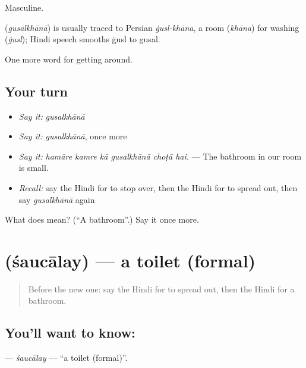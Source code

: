 Masculine.

\begin{cousinweb}
\textbf{} (\emph{gusalkhānā}) is usually traced to Persian \emph{ġusl-khāna}, a room (\emph{khāna}) for washing (\emph{ġusl}); Hindi speech smooths ġusl to gusal.
\end{cousinweb}

\begin{grammarlens}[title={What you've built}]
One more word for getting around.
\end{grammarlens}

\subsection*{Your turn}
\begin{itemize}
\raggedright
  \item \emph{Say it:} \emph{gusalkhānā}
  \item \emph{Say it:} \emph{gusalkhānā}, once more
  \item \emph{Say it:} \emph{hamāre kamre kā gusalkhānā choṭā hai.} — The bathroom in our room is small.
  \item \emph{Recall:} say the Hindi for to stop over, then the Hindi for to spread out, then say \emph{gusalkhānā} again
\end{itemize}

\begin{tcolorbox}[breakable,colback=teal!4,colframe=teal!35!black,title={Before you move on}]
What does  mean? (\textquotedblleft{}A bathroom\textquotedblright{}.) Say it once more.
\end{tcolorbox}
\section[\texorpdfstring{\hi{शौचालय} (śaucālay)}{शौचालय (śaucālay)}]{ (śaucālay) — a toilet (formal)}

\label{lesson:HI-C414-saucalay}



\begin{quote}
Before the new one: say the Hindi for to spread out, then the Hindi for a bathroom.
\end{quote}

\subsection*{You'll want to know: }
\textbf{} — \emph{śaucālay} — \textquotedblleft{}a toilet (formal)\textquotedblright{}.

